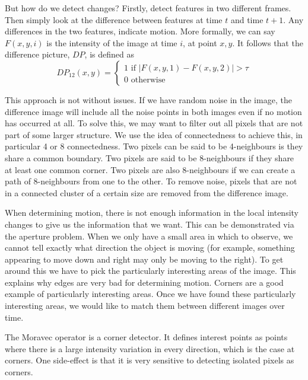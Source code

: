 \documentclass{article}
\begin{document}
	But how do we detect changes? Firstly, detect features in two different frames. Then simply look at the difference between features at time $t$ and time $t + 1$. Any differences in the two features, indicate motion. More formally, we can say $F(x, y, i)$ is the intensity of the image at time $i$, at point $x, y$. It follows that the difference picture, $DP$, is defined as 
	\[ DP_{12}(x, y) = \begin{cases}
		1 \text{ if } |F(x, y, 1) - F(x, y, 2)| > \tau \\
		0 \text{ otherwise}
		\end{cases} \]
		
	This approach is not without issues. If we have random noise in the image, the difference image will include all the noise points in both images even if no motion has occurred at all. To solve this, we may want to filter out all pixels that are not part of some larger structure. We use the idea of connectedness to achieve this, in particular 4 or 8 connectedness. Two pixels can be said to be 4-neighbours is they share a common boundary. Two pixels are said to be 8-neighbours if they share at least one common corner. Two pixels are also 8-neighbours if we can create a path of 8-neighbours from one to the other. To remove noise, pixels that are not in a connected cluster of a certain size are removed from the difference image.
	
	\par 
	When determining motion, there is not enough information in the local intensity changes to give us the information that we want. This can be demonstrated via the aperture problem. When we only have a small area in which to observe, we cannot tell exactly what direction the object is moving (for example, something appearing to move down and right may only be moving to the right). To get around this we have to pick the particularly interesting areas of the image. This explains why edges are very bad for determining motion. Corners are a good example of particularly interesting areas. Once we have found these particularly interesting areas, we would like to match them between different images over time.
	
	\par 
	The Moravec operator is a corner detector. It defines interest points as points where there is a large intensity variation in every direction, which is the case at corners. One side-effect is that it is very sensitive to detecting isolated pixels as corners.
	
\end{document}
